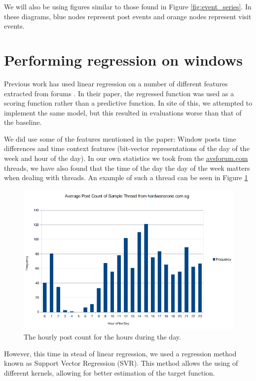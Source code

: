 We will also be using figures similar to those found in Figure 
\ref{fig:event_series}. In these diagrams, blue nodes represent post events and 
orange nodes represent visit events.


\section{Performing regression on windows}
Previous work has used linear regression on a number of different features 
extracted from forums \cite{Yang2009}. In their paper, the regressed function 
was used as a scoring function rather than a predictive function. In site of 
this, we attempted to implement the same model, but this resulted in evaluations 
worse than that of the baseline.

We did use some of the features mentioned in the paper: Window posts time 
differences and time context features (bit-vector representations of the day of 
the week and hour of the day). In our own statistics we took from the 
\url{avsforum.com} threads, we have also found that the time of the day the day 
of the week matters when dealing with threads. An example of such a thread can 
be seen in Figure \ref{fig:hr_freq}

\begin{figure}
\begin{center}
\includegraphics[scale=0.5]{diagrams/threadfreq.png}
\caption{The hourly post count for the hours during the day.}
\label{fig:hr_freq}
\end{center}
\end{figure}

 However, this time in stead of linear regression, we used a regression method 
known as Support Vector Regression (SVR). This method allows the using of 
different kernels, allowing for better estimation of the target function.

